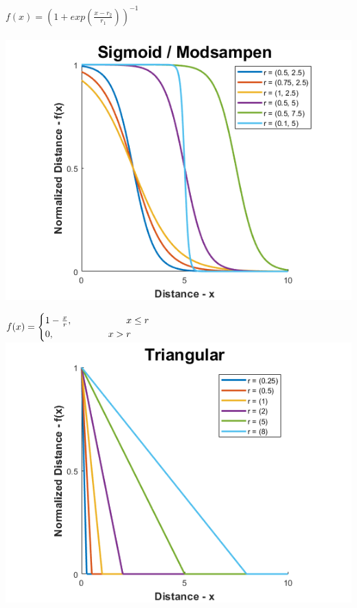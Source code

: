 \documentclass[12pt, a4paper, titlepage, openany]{book}
\begin{document}
\begin{description}[labelsep=1cm, labelwidth=2cm, nosep,style=multiline,leftmargin=3cm]
\begin{description}[labelsep=14em, labelwidth=10em, nosep,style=multiline,leftmargin=6cm]
	\item[\texttt{"sigmoid"/"modsampen"}]	$f(x) = (1+exp(\frac{x-r_2}{r_1}))^{-1}$\\ \ \\
		\includegraphics[scale=.5]{Fuzz2v1.png} \\

	\item[\texttt{"triangular"}]	  $f(x) = \begin{cases} 1 - \frac{x}{r},  \hspace{20mm}  x\le r 
	\\ 0,  \hspace{20mm}  x>r \end{cases}$\\
		\includegraphics[scale=.5]{FuzzTriv1.png} \\


\end{description}
\end{description}
\end{document}
